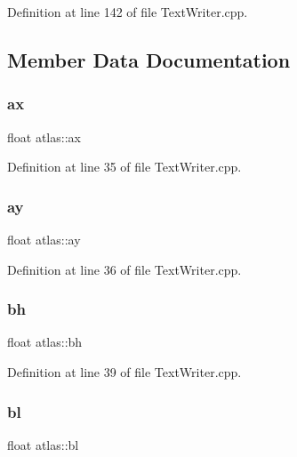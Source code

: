Definition at line 142 of file Text\+Writer.\+cpp.



\subsection{Member Data Documentation}
\mbox{\label{structatlas_a1c10daf375be9d49b1797a45c1afd0bc}} 
\subsubsection{\texorpdfstring{ax}{ax}}
{\footnotesize\ttfamily float atlas\+::ax}



Definition at line 35 of file Text\+Writer.\+cpp.

\mbox{\label{structatlas_a5bc5678efa5b336eb147d01546c382a1}} 
\subsubsection{\texorpdfstring{ay}{ay}}
{\footnotesize\ttfamily float atlas\+::ay}



Definition at line 36 of file Text\+Writer.\+cpp.

\mbox{\label{structatlas_aade1078df1660281c69cc7c94bdd498a}} 
\subsubsection{\texorpdfstring{bh}{bh}}
{\footnotesize\ttfamily float atlas\+::bh}



Definition at line 39 of file Text\+Writer.\+cpp.

\mbox{\label{structatlas_a131ed5aac43de689ed8578ec9ce26788}} 
\subsubsection{\texorpdfstring{bl}{bl}}
{\footnotesize\ttfamily float atlas\+::bl}



